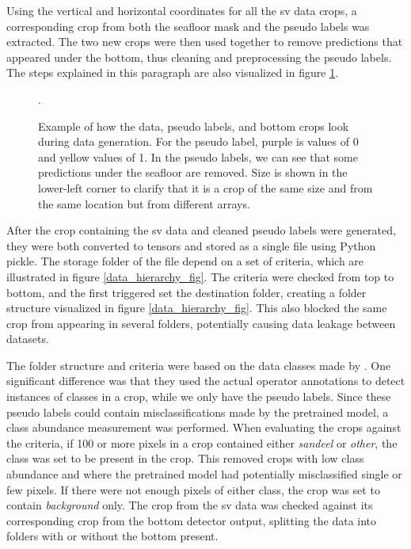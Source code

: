         Using the vertical and horizontal coordinates for all the \gls{sv} data crops, a corresponding crop from both the seafloor mask and the pseudo labels was extracted. The two new crops were then used together to remove predictions that appeared under the bottom, thus cleaning and preprocessing the pseudo labels. The steps explained in this paragraph are also visualized in figure \ref{crop_extract_fig}.

        
        \begin{figure}[H]
            \centering
            
            \caption[Data, label and bottom crop extraction and interaction]{Example of how the data, pseudo labels, and bottom crops look during data generation. For the pseudo label, purple is values of 0 and yellow values of 1. In the pseudo labels, we can see that some predictions under the seafloor are removed.  Size is shown in the lower-left corner to clarify that it is a crop of the same size and from the same location but from different arrays.}.
          	\medskip 
            \label{crop_extract_fig}
        \end{figure}
        
        After the crop containing the \gls{sv} data and cleaned pseudo labels were generated, they were both converted to tensors and stored as a single file using Python pickle. The storage folder of the file depend on a set of criteria, which are illustrated in figure \ref{data_hierarchy_fig}. The criteria were checked from top to bottom, and the first triggered set the destination folder, creating a folder structure visualized in figure \ref{data_hierarchy_fig}. This also blocked the same crop from appearing in several folders, potentially causing data leakage between datasets.

        The folder structure and criteria were based on the data classes made by \citeauthor{brautaset2020acoustic}\cite{brautaset2020acoustic}. One significant difference was that they used the actual operator annotations to detect instances of classes in a crop, while we only have the pseudo labels. Since these pseudo labels could contain misclassifications made by the pretrained model, a class abundance measurement was performed. When evaluating the crops against the criteria, if 100 or more pixels in a crop contained either \textit{sandeel} or \textit{other}, the class was set to be present in the crop. This removed crops with low class abundance and where the pretrained model had potentially misclassified single or few pixels. If there were not enough pixels of either class, the crop was set to contain \textit{background} only. The crop from the \gls{sv} data was checked against its corresponding crop from the bottom detector output, splitting the data into folders with or without the bottom present.
                
